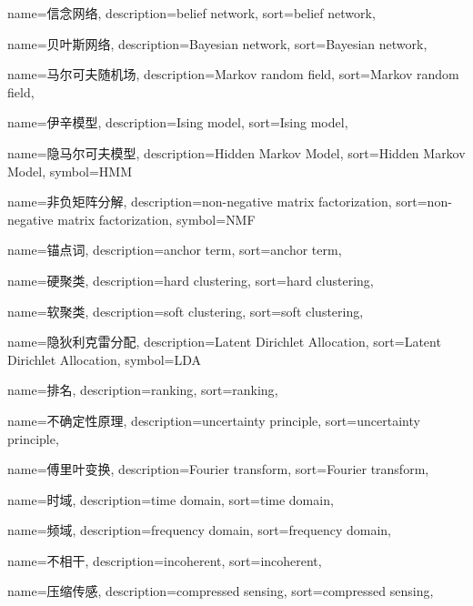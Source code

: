 {
	name=信念网络,
	description={belief network},
	sort={belief network},
}

{
	name=贝叶斯网络,
	description={Bayesian network},
	sort={Bayesian network},
}

{
	name=马尔可夫随机场,
	description={Markov random field},
	sort={Markov random field},
}

{
	name=伊辛模型,
	description={Ising model},
	sort={Ising model},
}

{
	name=隐马尔可夫模型,
	description={Hidden Markov Model},
	sort={Hidden Markov Model},
	symbol={HMM}
}

{
	name=非负矩阵分解,
	description={non-negative matrix factorization},
	sort={non-negative matrix factorization},
	symbol={NMF}
}

{
	name=锚点词,
	description={anchor term},
	sort={anchor term},
}

{
	name=硬聚类,
	description={hard clustering},
	sort={hard clustering},
}

{
	name=软聚类,
	description={soft clustering},
	sort={soft clustering},
}

{
	name=隐狄利克雷分配,
	description={Latent Dirichlet Allocation},
	sort={Latent Dirichlet Allocation},
	symbol={LDA}
}

{
	name=排名,
	description={ranking},
	sort={ranking},
}

{
	name=不确定性原理,
	description={uncertainty principle},
	sort={uncertainty principle},
}

{
	name=傅里叶变换,
	description={Fourier transform},
	sort={Fourier transform},
}

{
	name=时域,
	description={time domain},
	sort={time domain},
}

{
	name=频域,
	description={frequency domain},
	sort={frequency domain},
}

{
	name=不相干,
	description={incoherent},
	sort={incoherent},
}



{
	name=压缩传感,
	description={compressed sensing},
	sort={compressed sensing},
}

